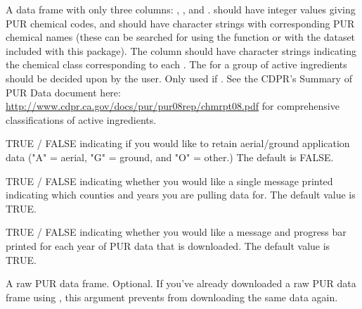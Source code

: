 \documentclass[a4paper]{book}
\begin{document}
\begin{Arguments}
\begin{ldescription}
\item[\code{chemical\_class}] A data frame with only three columns: ,
, and .  should have
integer values giving PUR chemical codes, and  should have
character strings with corresponding PUR chemical names (these can be
searched for using the  function or with the
 dataset included with this package). The
 column should have character strings indicating the
chemical class corresponding to each . The
 for a group of active ingredients should be decided
upon by the user. Only used if . See
the CDPR's Summary of PUR Data document here:
\url{http://www.cdpr.ca.gov/docs/pur/pur08rep/chmrpt08.pdf} for
comprehensive classifications of active ingredients.

\item[\code{aerial\_ground}] TRUE / FALSE indicating if you would like to
retain aerial/ground application data ("A" = aerial, "G" = ground, and
"O" = other.) The default is FALSE.

\item[\code{verbose}] TRUE / FALSE indicating whether you would like a single message
printed indicating which counties and years you are pulling data for. The
default value is TRUE.

\item[\code{download\_progress}] TRUE / FALSE indicating whether you would like a
message and progress bar printed for each year of PUR data that is downloaded.
The default value is TRUE.

\item[\code{raw\_pur\_df}] A raw PUR data frame. Optional. If you've already downloaded
a raw PUR data frame using , this argument prevents
 from downloading the same data again.
\end{ldescription}
\end{Arguments}
%
\end{document}
